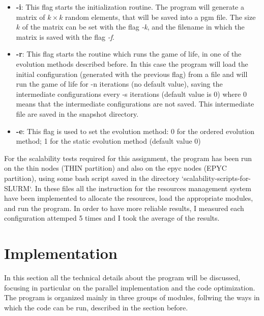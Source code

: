 \documentclass[12pt, titlepage]{report}
\begin{document}
\begin{itemize}
	\item \textbf{-i}: This flag starts the initialization routine. The program will generate a matrix of $k\times k$ random elements, that will be saved into a pgm file. The size $k$ of the matrix can be set with the flag \emph{-k}, and the filename in which the matrix is saved with the flag \emph{-f}.
	\item \textbf{-r}: This flag starts the routine which runs the game of life, in one of the evolution methods described before. 
	In this case the program will load the initial configuration (generated with the previous flag) from a file and will run the game of life
	for -n iterations (no default value), saving the intermediate configurations every -s iterations (default value is 0) where
	0 means that the intermediate configurations are not saved. This intermediate file are saved in the snapshot directory.
	\item \textbf{-e}: This flag is used to set the evolution method: 0 for the ordered evolution method; 1 for the static evolution method (default value 0)
\end{itemize}
For the scalability tests required for this assignment, the program has been run on the thin nodes (THIN partition) and also on the epyc nodes (EPYC partition),
using some bash script saved in the directory `scalability-scripts-for-SLURM`. In these files all the instruction for the resources management system have been implemented to allocate 
the resources, load the appropriate modules, and run the program. In order to have more reliable results, I measured each configuration attemped 5 times and I took the average of the results.


\section{Implementation}\label{Implementation}

In this section all the technical details about the program will be discussed, focusing in particular on the parallel implementation and the 
code optimization. The program is organized mainly in three groups of modules, follwing the ways in which the code can be run, described in the section before.
\end{document}
